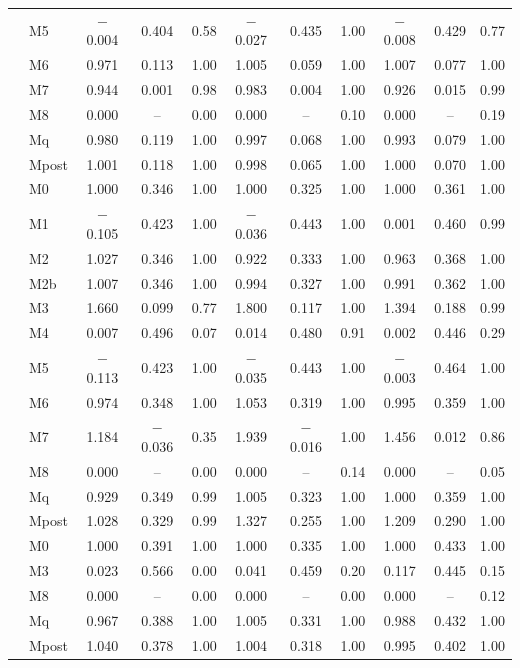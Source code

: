 \begin{tabular}{@{}llccccccccc@{}}
 & M5 & $-$0.004 & 0.404 & 0.58 & $-$0.027 & 0.435 & 1.00 & $-$0.008 & 0.429 & 0.77 \\
 & M6 & 0.971 & 0.113 & 1.00 & 1.005 & 0.059 & 1.00 & 1.007 & 0.077 & 1.00 \\
 & M7 & 0.944 & 0.001 & 0.98 & 0.983 & 0.004 & 1.00 & 0.926 & 0.015 & 0.99 \\
 & M8 & 0.000 & -- & 0.00 & 0.000 & -- & 0.10 & 0.000 & -- & 0.19 \\
 & Mq & 0.980 & 0.119 & 1.00 & 0.997 & 0.068 & 1.00 & 0.993 & 0.079 & 1.00 \\
 & Mpost & 1.001 & 0.118 & 1.00 & 0.998 & 0.065 & 1.00 & 1.000 & 0.070 & 1.00 \\
\midrule
\fmtPost{} & M0 & 1.000 & 0.346 & 1.00 & 1.000 & 0.325 & 1.00 & 1.000 & 0.361 & 1.00 \\
 & M1 & $-$0.105 & 0.423 & 1.00 & $-$0.036 & 0.443 & 1.00 & 0.001 & 0.460 & 0.99 \\
 & M2 & 1.027 & 0.346 & 1.00 & 0.922 & 0.333 & 1.00 & 0.963 & 0.368 & 1.00 \\
 & M2b & 1.007 & 0.346 & 1.00 & 0.994 & 0.327 & 1.00 & 0.991 & 0.362 & 1.00 \\
 & M3 & 1.660 & 0.099 & 0.77 & 1.800 & 0.117 & 1.00 & 1.394 & 0.188 & 0.99 \\
 & M4 & 0.007 & 0.496 & 0.07 & 0.014 & 0.480 & 0.91 & 0.002 & 0.446 & 0.29 \\
 & M5 & $-$0.113 & 0.423 & 1.00 & $-$0.035 & 0.443 & 1.00 & $-$0.003 & 0.464 & 1.00 \\
 & M6 & 0.974 & 0.348 & 1.00 & 1.053 & 0.319 & 1.00 & 0.995 & 0.359 & 1.00 \\
 & M7 & 1.184 & $-$0.036 & 0.35 & 1.939 & $-$0.016 & 1.00 & 1.456 & 0.012 & 0.86 \\
 & M8 & 0.000 & -- & 0.00 & 0.000 & -- & 0.14 & 0.000 & -- & 0.05 \\
 & Mq & 0.929 & 0.349 & 0.99 & 1.005 & 0.323 & 1.00 & 1.000 & 0.359 & 1.00 \\
 & Mpost & 1.028 & 0.329 & 0.99 & 1.327 & 0.255 & 1.00 & 1.209 & 0.290 & 1.00 \\
\midrule
\fmtNone{} & M0 & 1.000 & 0.391 & 1.00 & 1.000 & 0.335 & 1.00 & 1.000 & 0.433 & 1.00 \\
 & M3 & 0.023 & 0.566 & 0.00 & 0.041 & 0.459 & 0.20 & 0.117 & 0.445 & 0.15 \\
 & M8 & 0.000 & -- & 0.00 & 0.000 & -- & 0.00 & 0.000 & -- & 0.12 \\
 & Mq & 0.967 & 0.388 & 1.00 & 1.005 & 0.331 & 1.00 & 0.988 & 0.432 & 1.00 \\
 & Mpost & 1.040 & 0.378 & 1.00 & 1.004 & 0.318 & 1.00 & 0.995 & 0.402 & 1.00 \\
\bottomrule
\end{tabular}
